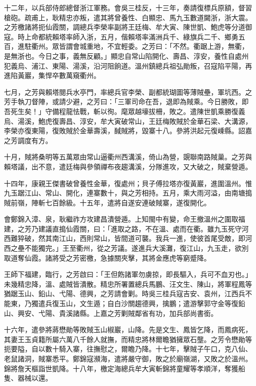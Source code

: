 \begin{pinyinscope}
十二年，以兵部侍郎總督浙江軍務。會吳三桂反，十三年，奏請復標兵原額，督習槍砲。疏甫上，耿精忠亦叛，遣其將曾養性、白顯忠、馬九玉數道闚浙，浙大震。之芳檄諸將扼仙霞關，調總兵李榮率副將王廷梅、牟大寅、陳世凱、鮑虎等分道御寇。時上命都統賴塔率師入浙，五月，偕賴塔率滿洲兵千、綠旗兵二千、鄉勇五百，進駐衢州。眾皆謂會城重地，不宜輕委。之芳曰：「不然。衢踞上游，無衢，是無浙也。今日之事，義無反顧。」顯忠自常山陷開化、壽昌、淳安，養性自處州犯義烏、浦江、東陽、湯溪，沿河阻餉道。溫州鎮總兵祖弘勛叛，召寇陷平陽，再進陷黃巖，集悍卒數萬窺衢州。

七月，之芳與賴塔閱兵水亭門，率總兵官李榮、副都統瑚圖等薄賊壘，軍坑西。之芳手執刀督陣，或請少避，之芳曰：「三軍司命在吾，退即為賊乘。今日勝敗，即吾死生矣！」守備程龍怯戰，斬以徇。麾眾越壕拔柵，敗之。遣陳世凱乘勝復義烏、湯溪，鮑虎復壽昌、淳安，牟大寅破常山，王廷梅敗賊於金華石梁、大溝源，李榮亦復東陽，復敗賊於金華壽溪，馘賊將，毀寨十八。參將洪起元復嵊縣。詔嘉之芳調度有方。

十月，賊將桑明等五萬眾由常山逼衢州西溝溪，倚山為營，覬聯南路賊巢。之芳與賴塔議，出不意，遣廷梅與參領禪布夜趨溝溪，分隊進攻，又大破之，賊棄營遁。

十四年，康親王傑書破曾養性金華，復處州；貝子傅拉塔亦復黃巖，進圍溫州。惟九玉踞江山、常山、開化，連寨數十，與之芳相持。五月，乘大雨河溢，由南塘搗賊前嶺，陣斬七百餘級。十五年，遣將自遂安連破賊寨，遂復開化。

會鄭錦入漳、泉，耿繼祚方攻建昌潰營遁。上知閩中有變，命王撤溫州之圍取福建，之芳乃建議直搗仙霞關，曰：「進取之路，不在溫、處而在衢。雖九玉死守河西難猝破，然其南江山，西則常山，皆間道可襲。我兵一進，使彼首尾受敵，即河西之壘不能獨完。」王至衢州，從之芳議。遂進兵大溪灘，復江山，九玉走，欲別取道奪仙霞。諸將受之芳密檄，急據關夾擊，其將金應虎等窮蹙降。

王師下福建，臨行，之芳啟曰：「王但飭諸軍勿虜掠，即長驅入，兵可不血刃也。」未幾精忠降，溫、處賊皆潰散。精忠所署置總兵馬鵬、汪文生、陳山，將軍程鳳等猶踞玉山、鉛山、弋陽、德興，之芳請會剿。時吳三桂兵寇吉安、袁州，江西兵不能東，乃獨遣兵復玉山，文生遁；自白沙關趨德興，擒鵬；遣游擊郭守金等復鉛山、興安、弋陽、貴溪諸縣。上嘉之芳剿賊鄰省有功，加兵部尚書銜。

十六年，遣參將蔣懋勛等敗賊玉山椒巖，山降。先是文生、鳳皆乞降，而鳳病死，其妻王玉貞籍所屬六萬八千餘人就撫，而精忠將林爾瞻猶擁眾石壟。之芳令懋勛等扼要隘，自以數十騎入寨，往撫慰之，爾瞻乃降。十七年，擊賊子午口，克八仙、老鼠諸洞，賊寨悉平。鄭錦寇瀕海，遣將嚴守御，敗之於廟嶺湖，又敗之於溫州。錦將詹天樞詣世凱降。十八年，檄定海總兵牟大寅斬錦將童耀等孝順洋，奪獲船隻、器械以還。


\end{pinyinscope}
